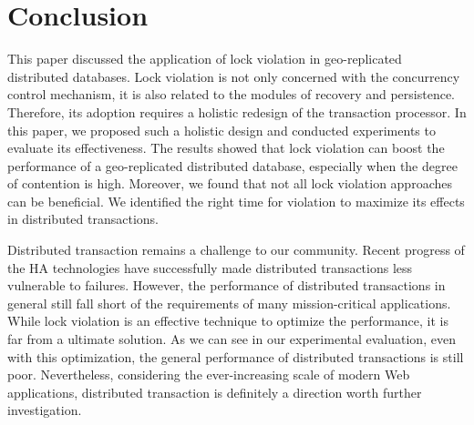\documentclass[conference]{IEEEtran}
\begin{document}
\section{Conclusion}
\label{sec:conclusion}

This paper discussed the application of lock violation in geo-replicated distributed databases.
Lock violation is not only concerned with the concurrency control mechanism, it is also related to the modules of recovery and persistence.
Therefore, its adoption requires a holistic redesign of the transaction processor. 
In this paper, we proposed such a holistic design and conducted experiments to evaluate its effectiveness.
The results showed that lock violation can boost the performance of a geo-replicated distributed database, especially when the degree of contention is high.
Moreover, we found that not all lock violation approaches can be beneficial. We identified the right time for violation to maximize its effects in distributed transactions. 

Distributed transaction remains a challenge to our community. Recent progress of the HA technologies have successfully made distributed transactions less vulnerable to failures.
However, the performance of distributed transactions in general still fall short of the requirements of many mission-critical applications.
While lock violation is an effective technique to optimize the performance, it is far from a ultimate solution.
As we can see in our experimental evaluation, even with this optimization, the general performance of distributed transactions is still poor.
Nevertheless, considering the ever-increasing scale of modern Web applications, distributed transaction is definitely a direction worth further investigation.



\end{document}

